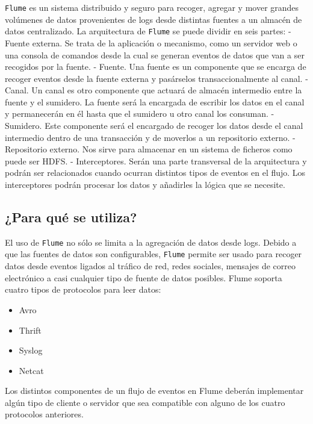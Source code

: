 \documentclass[]{article}
\begin{document}
\texttt{Flume} es un sistema distribuido y seguro para recoger, agregar
y mover grandes volúmenes de datos provenientes de logs desde distintas
fuentes a un almacén de datos centralizado. La arquitectura de
\texttt{Flume} se puede dividir en seis partes: - Fuente externa. Se
trata de la aplicación o mecanismo, como un servidor web o una consola
de comandos desde la cual se generan eventos de datos que van a ser
recogidos por la fuente. - Fuente. Una fuente es un componente que se
encarga de recoger eventos desde la fuente externa y pasárselos
transaccionalmente al canal. - Canal. Un canal es otro componente que
actuará de almacén intermedio entre la fuente y el sumidero. La fuente
será la encargada de escribir los datos en el canal y permanecerán en él
hasta que el sumidero u otro canal los consuman. - Sumidero. Este
componente será el encargado de recoger los datos desde el canal
intermedio dentro de una transacción y de moverlos a un repositorio
externo. - Repositorio externo. Nos sirve para almacenar en un sistema
de ficheros como puede ser HDFS. - Interceptores. Serán una parte
transversal de la arquitectura y podrán ser relacionados cuando ocurran
distintos tipos de eventos en el flujo. Los interceptores podrán
procesar los datos y añadirles la lógica que se necesite.

\subsection{¿Para qué se utiliza?}\label{para-que-se-utiliza}

El uso de \texttt{Flume} no sólo se limita a la agregación de datos
desde logs. Debido a que las fuentes de datos son configurables,
\texttt{Flume} permite ser usado para recoger datos desde eventos
ligados al tráfico de red, redes sociales, mensajes de correo
electrónico a casi cualquier tipo de fuente de datos posibles. Flume
soporta cuatro tipos de protocolos para leer datos:

\begin{itemize}
\itemsep1pt\parskip0pt
\item
  Avro
\item
  Thrift
\item
  Syslog
\item
  Netcat
\end{itemize}

Los distintos componentes de un flujo de eventos en Flume deberán
implementar algún tipo de cliente o servidor que sea compatible con
alguno de los cuatro protocolos anteriores.
\end{document}
